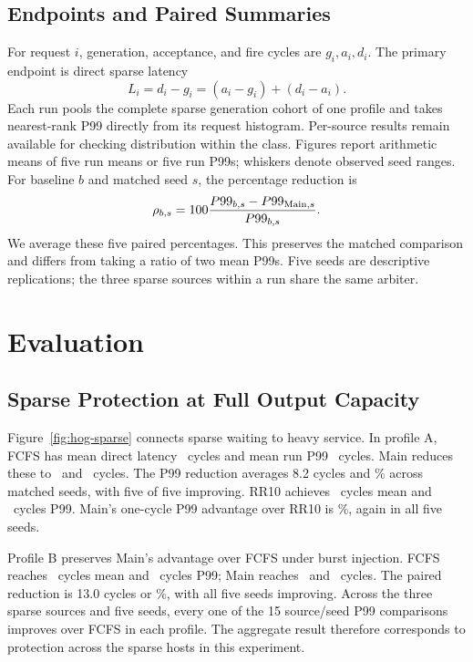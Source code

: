 \subsection{Endpoints and Paired Summaries}
For request $i$, generation, acceptance, and fire cycles are $g_i,a_i,d_i$.
The primary endpoint is direct sparse latency
\begin{equation}
 L_i=d_i-g_i=(a_i-g_i)+(d_i-a_i).
 \label{eq:latency}
\end{equation}
Each run pools the complete sparse generation cohort of one profile and takes
nearest-rank P99 directly from its request histogram. Per-source results remain
available for checking distribution within the class. Figures report arithmetic
means of five run means or five run P99s; whiskers denote observed seed ranges.
For baseline $b$ and matched seed $s$, the percentage reduction is
\begin{equation}
 \rho_{b,s}=100\frac{P99_{b,s}-P99_{{\rm Main},s}}{P99_{b,s}}.
 \label{eq:paired}
\end{equation}
We average these five paired percentages. This preserves the matched comparison
and differs from taking a ratio of two mean P99s. Five seeds are descriptive
replications; the three sparse sources within a run share the same arbiter.

\section{Evaluation}
\subsection{Sparse Protection at Full Output Capacity}
Figure~\ref{fig:hog-sparse} connects sparse waiting to heavy service. In profile A,
FCFS has mean direct latency \HSMeanAFCFS\ cycles and mean run P99
\HSPtailAFCFS\ cycles. Main reduces these to \HSMeanAMain\ and
\HSPtailAMain\ cycles. The P99 reduction averages 8.2 cycles and
\HSReductionAFCFS\% across matched seeds, with five of five improving. RR10
achieves \HSMeanARR\ cycles mean and \HSPtailARR\ cycles P99. Main's one-cycle
P99 advantage over RR10 is \HSReductionARR\%, again in all five seeds.



Profile B preserves Main's advantage over FCFS under burst injection. FCFS
reaches \HSMeanBFCFS\ cycles mean and \HSPtailBFCFS\ cycles P99; Main reaches
\HSMeanBMain\ and \HSPtailBMain\ cycles. The paired reduction is 13.0 cycles
or \HSReductionBFCFS\%, with all five seeds improving. Across the three sparse
sources and five seeds, every one of the 15 source/seed P99 comparisons improves
over FCFS in each profile. The aggregate result therefore corresponds to
protection across the sparse hosts in this experiment.

